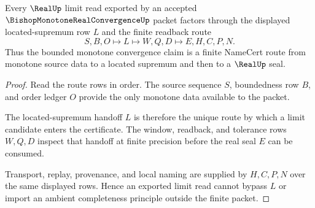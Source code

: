 \begin{theorem}
\label{thm:bishop-monotone-real-convergence-located-supremum-route}
Every $\RealUp$ limit read exported by an accepted $\BishopMonotoneRealConvergenceUp$ packet factors through the displayed located-supremum row $L$ and the finite readback route
$$
S,B,O \longmapsto L \longmapsto W,Q,D \longmapsto E,H,C,P,N .
$$
Thus the bounded monotone convergence claim is a finite NameCert route from monotone source data to a located supremum and then to a $\RealUp$ seal.
\end{theorem}
\begin{proof}
Read the route rows in order. The source sequence $S$, boundedness row $B$, and order ledger $O$ provide the only monotone data available to the packet.

The located-supremum handoff $L$ is therefore the unique route by which a limit candidate enters the certificate. The window, readback, and tolerance rows $W,Q,D$ inspect that handoff at finite precision before the real seal $E$ can be consumed.

Transport, replay, provenance, and local naming are supplied by $H,C,P,N$ over the same displayed rows. Hence an exported limit read cannot bypass $L$ or import an ambient completeness principle outside the finite packet.
\end{proof}



